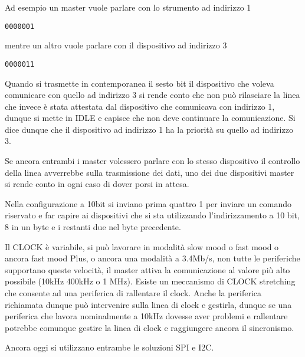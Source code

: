 Ad esempio un master vuole parlare con lo strumento ad indirizzo 1

\verb|0000001|

mentre un altro vuole parlare con il dispositivo ad indirizzo 3

\verb|0000011|

Quando si trasmette in contemporanea il sesto bit il dispositivo che voleva
comunicare con quello ad indirizzo 3 si rende conto che non può rilasciare la
linea che invece è stata attestata dal dispositivo che comunicava con indirizzo
1, dunque si mette in IDLE e capisce che non deve continuare la comunicazione.
Si dice dunque che il dispositivo ad indirizzo 1 ha la priorità su quello ad
indirizzo 3.

Se ancora entrambi i master volessero parlare con lo stesso dispositivo il
controllo della linea avverrebbe sulla trasmissione dei dati, uno dei due
dispositivi master si rende conto in ogni caso di dover porsi in attesa.

Nella configurazione a 10bit si inviano prima quattro 1 per inviare un comando
riservato e far capire ai dispositivi che si sta utilizzando l'indirizzamento a
10 bit, 8 in un byte e i restanti due nel byte precedente.


Il CLOCK è variabile, si può lavorare in modalità slow mood o fast mood o
ancora fast mood Plus, o ancora una modalità a 3.4Mb/s, non tutte le
periferiche supportano queste velocità, il master attiva la comunicazione al
valore più alto possibile (10kHz 400kHz o 1 MHz).
Esiste un meccanismo di CLOCK stretching che consente ad una periferica di
rallentare il clock. Anche la periferica richiamata dunque può intervenire
sulla linea di clock e gestirla, dunque se una periferica che lavora
nominalmente a 10kHz dovesse aver problemi e rallentare potrebbe comunque
gestire la linea di clock e raggiungere ancora il sincronismo.

Ancora oggi si utilizzano entrambe le soluzioni SPI e I2C.


